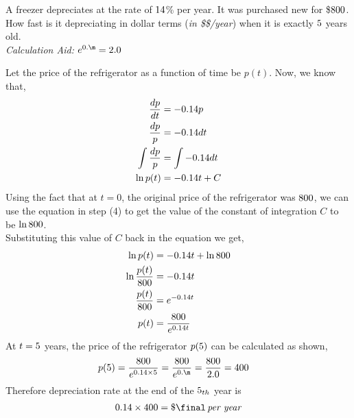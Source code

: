 



\MULTIPLY\dep\yrs\m
\gcalcexpr[2]

\question A freezer depreciates at the rate of $14$\% per year. It
was purchased new for \$$800$. How fast is it depreciating in dollar
terms (\textit{in \$\$/year}) when it is exactly $5$ years old.\\
\textit{Calculation Aid: $e^{0.\m}=\calcaid$}

\watchout

\begin{solution}
  Let the price of the refrigerator as a function of time be $p(t)$.
  Now, we know that,
  \begin{align}
    \dfrac{dp}{dt}    &= -0.14 p \\
    \dfrac{dp}{p}     &= -0.14 dt \\
    \int\dfrac{dp}{p} &= \int -0.14 dt \\
    \ln p(t)          &= -0.14 t + C
  \end{align}
  Using the fact that at $t=0$, the original price of the refrigerator 
  was $800$, we can use the equation in step (4) to get the value of 
  the constant of integration $C$ to be $\ln800$. \\
  Substituting this value of $C$ back in the equation we get,
  \begin{align}
    \ln p(t)                &= -0.14 t + \ln 800 \\
    \ln \dfrac{p(t)}{800} &= -0.14 t \\
    \dfrac{p(t)}{800}     &= e^{-0.14 t} \\
    p(t)                    &= \dfrac{800}{e^{0.14 t}}
  \end{align}
  At $t=5$ years, the price of the refrigerator $p(5)$ can be
  calculated as shown,
  \begin{align}
    p(\yrs) &= \dfrac{\cost}{e^{0.\dep\times\yrs}}
             = \dfrac{\cost}{e^{0.\m}} = \dfrac{\cost}{\calcaid}
             = \p
  \end{align}
  Therefore depreciation rate at the end of the $5_{th}$ year is
  \begin{align}
    0.\dep\times\p = \$\final\,\textit{per year}
  \end{align}

\end{solution}

